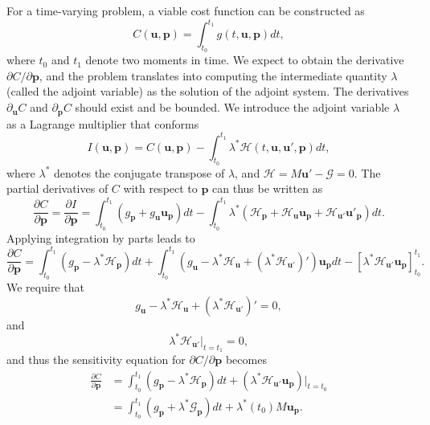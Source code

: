 \documentclass[preprint,3p,12pt,sort&compress]{elsarticle}
\begin{document}
For a time-varying problem, a viable cost function can be constructed as
\begin{equation}
    C(\mathbf u,\mathbf p)=\int_{t_0}^{t_1} g(t,\mathbf u,\mathbf p)dt,
\label{eq:continuous cost}
\end{equation}
where $t_0$ and $t_1$ denote two moments in time.
We expect to obtain the derivative $\partial C/\partial \mathbf p$, and the problem translates into computing the intermediate quantity $\lambda$ (called the adjoint variable) as the solution of the adjoint system.
The derivatives $\partial_{\mathbf u} C$ and $\partial_{\mathbf p} C$ should exist and be bounded.
We introduce the adjoint variable $\lambda$ as a Lagrange multiplier that conforms
\begin{equation}
    I(\mathbf u, \mathbf p)=C(\mathbf u, \mathbf p)-\int_{t_0}^{t_1} \lambda^* \mathcal H(t,\mathbf u,\mathbf u',\mathbf p) d t ,
\end{equation}
where $\lambda^*$ denotes the conjugate transpose of $\lambda$, and $\mathcal H = M \mathbf u' - \mathcal G=0$.
The partial derivatives of $C$ with respect to $\mathbf p$ can thus be written as
\begin{equation}
    \frac{\partial C}{\partial \mathbf p}=\frac{\partial  I}{\partial  \mathbf p}=\int_{t_0}^{t_1}\left(g_{\mathbf p}+g_{\mathbf u} \mathbf u_{\mathbf p}\right) d t-\int_{t_0}^{t_1} \lambda^*\left(\mathcal H_{\mathbf p}+\mathcal H_{\mathbf u} {\mathbf u}_{\mathbf p}+\mathcal H_{\mathbf u'} {\mathbf u}'_{\mathbf p}\right) d t.
\end{equation}
Applying integration by parts leads to
\begin{equation}
    \frac{\partial C}{\partial \mathbf p}=\int_{t_0}^{t_1}\left(g_{\mathbf p}-\lambda^*\mathcal H_{\mathbf p}\right) d t
    +\int_{t_0}^{t_1} (g_{\mathbf u}-\lambda^* \mathcal H_{\mathbf u}+(\lambda^* \mathcal H_{\mathbf u'})') \mathbf u_{\mathbf p} d t 
    - [\lambda^* \mathcal H_{\mathbf u'} \mathbf u_{\mathbf p}]_{t_0}^{t_1} .
\end{equation}
We require that
\begin{equation}
    g_{\mathbf u}-\lambda^* \mathcal H_{\mathbf u}+(\lambda^* \mathcal H_{\mathbf u'})'=0,
\end{equation}
and
\begin{equation}
    \lambda^* \mathcal H_{\mathbf u'} \vert_{t=t_1} =0,
\end{equation}
and thus the sensitivity equation for $\partial C/\partial \mathbf p$ becomes
\begin{equation}
\begin{aligned}
    \frac{\partial C}{\partial \mathbf p}&=\int_{t_0}^{t_1} \left(g_{\mathbf p}-\lambda^* \mathcal H_{\mathbf p}\right) d t +
    (\lambda^* \mathcal H_{\mathbf u'} \mathbf u_{\mathbf p}) \vert_{t=t_0} \\
    &=\int_{t_0}^{t_1} \left(g_{\mathbf p}+\lambda^* \mathcal G_{\mathbf p}\right) d t + \lambda^*(t_0) M \mathbf u_{\mathbf p}.
\end{aligned}
\label{eq:sensitivity}
\end{equation}
\end{document}
